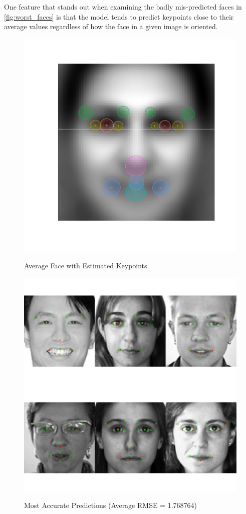 \documentclass[journal]{IEEEtran}
\begin{document}
One feature that stands out when examining the badly mis-predicted faces in \cref{fig:worst_faces} is that the model tends to predict keypoints close to their average values regardless of how the face in a given image is oriented.

\begin{figure}[!htb]
  \centering
  \caption{Average Face with Estimated Keypoints}
  \includegraphics[scale=.5]{avg_face_rmse.pdf}
  \label{fig:avg_face_rmse}
\end{figure}

\begin{figure}[!htb]
  \centering
  \caption{Most Accurate Predictions (Average RMSE = 1.768764)}
  \includegraphics[scale=.6]{best_faces.pdf}
  \label{fig:best_faces}
\end{figure}
\end{document}
